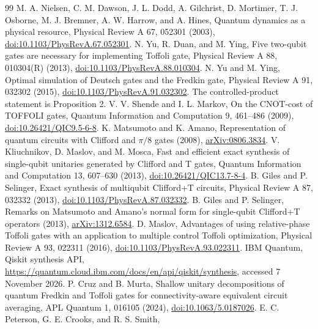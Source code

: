 \begin{thebibliography}{99}
 M. A. Nielsen, C. M. Dawson, J. L. Dodd, A. Gilchrist,
D. Mortimer, T. J. Osborne, M. J. Bremner, A. W. Harrow, and A. Hines,
Quantum dynamics as a physical resource, Physical Review A 67, 052301 (2003),
\href{https://doi.org/10.1103/PhysRevA.67.052301}{doi:10.1103/PhysRevA.67.052301}.
 N. Yu, R. Duan, and M. Ying, Five two-qubit gates are
necessary for implementing Toffoli gate, Physical Review A 88, 010304(R)
(2013), \href{https://doi.org/10.1103/PhysRevA.88.010304}{doi:10.1103/PhysRevA.88.010304}.
 N. Yu and M. Ying, Optimal simulation of Deutsch gates and
the Fredkin gate, Physical Review A 91, 032302 (2015),
\href{https://doi.org/10.1103/PhysRevA.91.032302}{doi:10.1103/PhysRevA.91.032302}.
The controlled-product statement is Proposition 2.
 V. V. Shende and I. L. Markov, On the CNOT-cost of
TOFFOLI gates, Quantum Information and Computation 9, 461--486 (2009),
\href{https://doi.org/10.26421/QIC9.5-6-8}{doi:10.26421/QIC9.5-6-8}.
 K. Matsumoto and K. Amano, Representation of quantum
circuits with Clifford and $\pi/8$ gates (2008),
\href{https://arxiv.org/abs/0806.3834}{arXiv:0806.3834}.
 V. Kliuchnikov, D. Maslov, and M. Mosca, Fast and efficient
exact synthesis of single-qubit unitaries generated by Clifford and T gates,
Quantum Information and Computation 13, 607--630 (2013),
\href{https://doi.org/10.26421/QIC13.7-8-4}{doi:10.26421/QIC13.7-8-4}.
 B. Giles and P. Selinger, Exact synthesis of multiqubit
Clifford+T circuits, Physical Review A 87, 032332 (2013),
\href{https://doi.org/10.1103/PhysRevA.87.032332}{doi:10.1103/PhysRevA.87.032332}.
 B. Giles and P. Selinger, Remarks on Matsumoto and Amano's
normal form for single-qubit Clifford+T operators (2013),
\href{https://arxiv.org/abs/1312.6584}{arXiv:1312.6584}.
 D. Maslov, Advantages of using relative-phase Toffoli gates
with an application to multiple control Toffoli optimization, Physical Review
A 93, 022311 (2016), \href{https://doi.org/10.1103/PhysRevA.93.022311}{doi:10.1103/PhysRevA.93.022311}.
 IBM Quantum, Qiskit synthesis API,
\url{https://quantum.cloud.ibm.com/docs/en/api/qiskit/synthesis},
accessed 7 November 2026.
 P. Cruz and B. Murta, Shallow unitary decompositions
of quantum Fredkin and Toffoli gates for connectivity-aware equivalent circuit
averaging, APL Quantum 1, 016105 (2024),
\href{https://doi.org/10.1063/5.0187026}{doi:10.1063/5.0187026}.
 E. C. Peterson, G. E. Crooks, and R. S. Smith,

\end{thebibliography}
